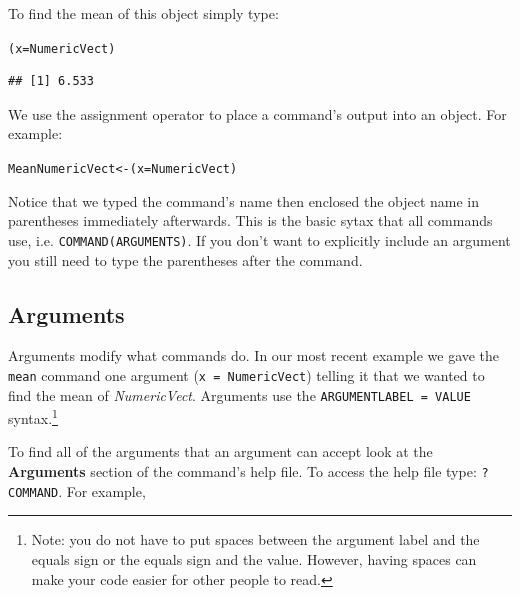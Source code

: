\documentclass[krantz1]{krantz}
\begin{document}
\noindent To find the mean of this object simply type:

\begin{knitrout}
\color{fgcolor}\begin{kframe}
\begin{alltt}
(x = NumericVect)
\end{alltt}
\begin{verbatim}
## [1] 6.533
\end{verbatim}
\end{kframe}
\end{knitrout}


\noindent We use the assignment operator to place a command's output into an object. For example:

\begin{knitrout}
\color{fgcolor}\begin{kframe}
\begin{alltt}
MeanNumericVect <- (x = NumericVect)
\end{alltt}
\end{kframe}
\end{knitrout}


\noindent Notice that we typed the command's name then enclosed the object name in parentheses immediately afterwards. This is the basic sytax that all commands use, i.e. \texttt{COMMAND(ARGUMENTS)}. If you don't want to explicitly include an argument you still need to type the parentheses after the command. 

\subsection{Arguments}\label{arguments}

Arguments modify what commands do. In our most recent example we gave the \texttt{mean} command one argument (\texttt{x = NumericVect}) telling it that we wanted to find the mean of {\emph{NumericVect}}. Arguments use the \texttt{ARGUMENTLABEL = VALUE} syntax.\footnote{Note: you do not have to put spaces between the argument label and the equals sign or the equals sign and the value. However, having spaces can make your code easier for other people to read.} 

To find all of the arguments that an argument can accept look at the {\bf{Arguments}} section of the command's help file. To access the help file type: \texttt{?COMMAND}. For example,
\end{document}
